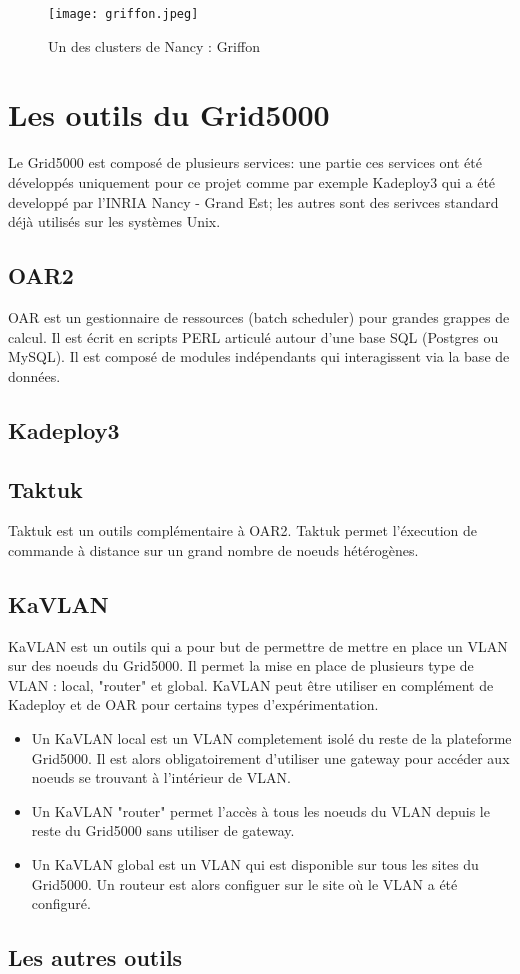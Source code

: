 \documentclass [10pt,a4paper]{report}
\begin{document}
\begin{figure}[!h]
		\centering
   		\texttt{[image: griffon.jpeg]}
   		\caption{Un des clusters de Nancy : Griffon}
    	\label{fig:griffon}
	\end{figure}
	
	\chapter{Les outils du Grid5000}
		Le Grid5000 est composé de plusieurs services: une partie ces services ont été développés uniquement pour ce projet comme par exemple Kadeploy3 qui a été developpé par l'INRIA Nancy - Grand Est; les autres sont des serivces standard déjà utilisés sur les systèmes Unix.  
		\section{OAR2}			
			OAR est un gestionnaire de ressources (batch scheduler) pour grandes grappes de calcul. Il est écrit en scripts PERL articulé autour d’une base SQL (Postgres ou MySQL). Il est composé de modules indépendants qui interagissent via la base de données.
		\section{Kadeploy3}
		\section{Taktuk}
			Taktuk est un outils complémentaire à OAR2. Taktuk permet l'éxecution de commande à distance sur un grand nombre de noeuds hétérogènes.
		\section{KaVLAN}
			KaVLAN est un outils qui a pour but de permettre de mettre en place un VLAN sur des noeuds du Grid5000. Il permet la mise en place de plusieurs type de VLAN : local, "router" et global. KaVLAN peut être utiliser en complément de Kadeploy et de OAR pour certains types d'expérimentation.\\
			\begin{itemize}
  				\item Un KaVLAN local est un VLAN completement isolé du reste de la plateforme Grid5000. Il est alors obligatoirement d'utiliser une gateway pour accéder aux noeuds se trouvant à l'intérieur de VLAN.
  				\item Un KaVLAN "router" permet l'accès à tous les noeuds du VLAN depuis le reste du Grid5000 sans utiliser de gateway.
 				 \item Un KaVLAN global est un VLAN qui est disponible sur tous les sites du Grid5000. Un routeur est alors configuer sur le site où le VLAN a été configuré.
			\end{itemize}
			
		\section{Les autres outils}
	
\end{document}
